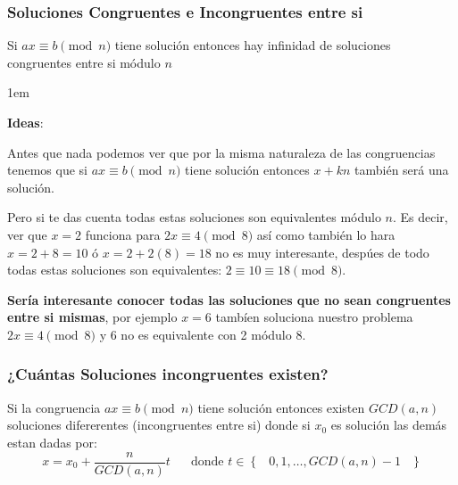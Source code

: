 \documentclass[12pt, fleqn]{report}                             %
\newenvironment{SmallIndentation}[1][0.75em]                    %
    {\begin{adjustwidth}{#1}{}\begin{footnotesize}}                 %
    {\end{footnotesize}\end{adjustwidth}}                           %
\DeclareMathOperator \Space {\quad}                             %
\DeclareMathOperator \MiniSpace {\;}                            %
\newcommand{\Set}[1]{\left\{ \MiniSpace #1 \MiniSpace \right\}} %
\begin{document}
            \subsubsection{Soluciones Congruentes e Incongruentes entre si}

                Si $ax \equiv b \pmod{n}$ tiene solución entonces hay infinidad
                de soluciones congruentes entre si módulo $n$ 

                \begin{SmallIndentation}[1em]
                    \textbf{Ideas}:
                    
                    Antes que nada podemos ver que por la misma naturaleza de las congruencias
                    tenemos que si $ax \equiv b \pmod{n}$ tiene solución entonces
                    $x + kn$ también será una solución.

                \end{SmallIndentation}
                    
                Pero si te das cuenta todas estas soluciones son equivalentes módulo $n$.
                Es decir, ver que $x=2$ funciona para $2x \equiv 4 \pmod{8}$ así como
                también lo hara $x=2+8=10$ ó $x=2+2(8)=18$ no es muy interesante, despúes
                de todo todas estas soluciones son equivalentes:
                $2 \equiv 10 \equiv 18 \pmod{8}$.
                

                \textbf{Sería interesante conocer todas las soluciones que no sean
                congruentes entre si mismas}, por ejemplo $x=6$ tambíen soluciona
                nuestro problema $2x \equiv 4 \pmod{8}$ y 6 no es equivalente con 2 módulo 8.


            \clearpage
            \subsubsection{¿Cuántas Soluciones incongruentes existen?}

                Si la congruencia $ax \equiv b \pmod{n}$ tiene solución entonces
                existen $GCD(a,n)$ soluciones difererentes (incongruentes entre si) donde
                si $x_0$ es solución las demás estan dadas por:
                \begin{equation*}
                    x = x_0 + \dfrac{n}{GCD(a,n)} t 
                        \Space\text{donde } t \in \Set{0, 1, \dots, GCD(a,n)-1}
                \end{equation*} 
\end{document}
